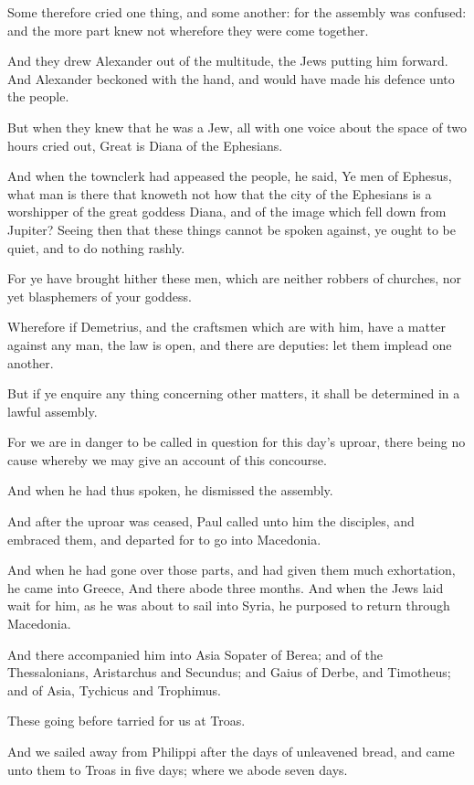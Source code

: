 \Verse Some therefore cried one thing, and some another: for the assembly was confused: and the more part knew not wherefore they were come together.

\Verse And they drew Alexander out of the multitude, the Jews putting him forward. And Alexander beckoned with the hand, and would have made his defence unto the people.

\Verse But when they knew that he was a Jew, all with one voice about the space of two hours cried out, Great is Diana of the Ephesians.

\Verse And when the townclerk had appeased the people, he said, Ye men of Ephesus, what man is there that knoweth not how that the city of the Ephesians is a worshipper of the great goddess Diana, and of the image which fell down from Jupiter?  \Verse Seeing then that these things cannot be spoken against, ye ought to be quiet, and to do nothing rashly.

\Verse For ye have brought hither these men, which are neither robbers of churches, nor yet blasphemers of your goddess.

\Verse Wherefore if Demetrius, and the craftsmen which are with him, have a matter against any man, the law is open, and there are deputies: let them implead one another.

\Verse But if ye enquire any thing concerning other matters, it shall be determined in a lawful assembly.

\Verse For we are in danger to be called in question for this day's uproar, there being no cause whereby we may give an account of this concourse.

\Verse And when he had thus spoken, he dismissed the assembly.


\Chapter
\Verse And after the uproar was ceased, Paul called unto him the disciples, and embraced them, and departed for to go into Macedonia.

\Verse And when he had gone over those parts, and had given them much exhortation, he came into Greece, \Verse And there abode three months.  And when the Jews laid wait for him, as he was about to sail into Syria, he purposed to return through Macedonia.

\Verse And there accompanied him into Asia Sopater of Berea; and of the Thessalonians, Aristarchus and Secundus; and Gaius of Derbe, and Timotheus; and of Asia, Tychicus and Trophimus.

\Verse These going before tarried for us at Troas.

\Verse And we sailed away from Philippi after the days of unleavened bread, and came unto them to Troas in five days; where we abode seven days.

